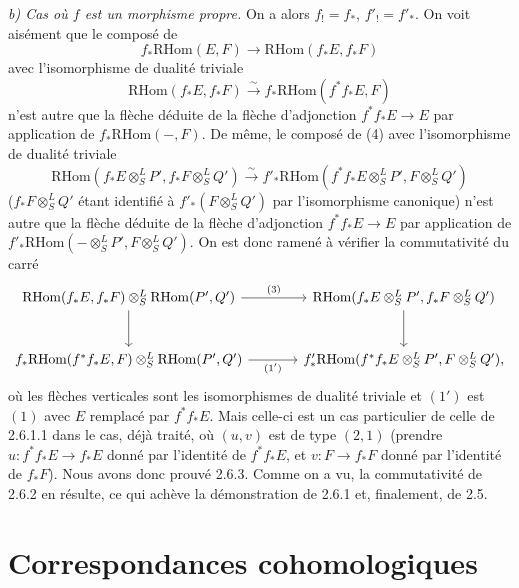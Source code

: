 \documentclass[11pt]{article}
\providecommand{\RHom}{\mathrm{RHom}}
\providecommand{\RHom}{\mathrm{RHom}}
\providecommand{\RHom}{\mathrm R\mathcal{H}om}
\begin{document}
\emph{b) Cas où $f$ est un morphisme propre.} On a alors $f_!=f_*$, $f'_!=f'_*$. On voit aisément que le composé de
\[
f_*\RHom(E,F)\longrightarrow\RHom(f_*E,f_*F)
\]
avec l'isomorphisme de dualité triviale
\[
\RHom(f_*E,f_*F)\xrightarrow{\sim}f_*\RHom(f^{*}f_*E,F)
\]
n'est autre que la flèche déduite de la flèche d'adjonction $f^{*}f_*E\to E$ par application de $f_*\RHom(-,F)$. De même, le composé de (4) avec l'isomorphisme de dualité triviale
\[
\RHom(f_*E\otimes^L_SP',f_*F\otimes^L_SQ')\xrightarrow{\sim}f'_*\RHom(f^{*}f_*E\otimes^L_SP',F\otimes^L_SQ')
\]
($f_*F\otimes^L_SQ'$ étant identifié à $f'_*(F\otimes^L_SQ')$ par l'isomorphisme canonique) n'est autre que la flèche déduite de la flèche d'adjonction $f^{*}f_*E\to E$ par application de $f'_*\RHom(-\otimes^L_SP',F\otimes^L_SQ')$. On est donc ramené à vérifier la commutativité du carré
\[
\begin{tikzcd}[column sep=large,row sep=large]
\RHom(f_*E,f_*F)\otimes^L_S\RHom(P',Q') \arrow[r,"(3)"] \arrow[d] & \RHom(f_*E\otimes^L_SP',f_*F\otimes^L_SQ') \arrow[d]\\
f_*\RHom(f^{*}f_*E,F)\otimes^L_S\RHom(P',Q') \arrow[r,"(1')"'] & f'_*\RHom(f^{*}f_*E\otimes^L_SP',F\otimes^L_SQ'),
\end{tikzcd}
\]
où les flèches verticales sont les isomorphismes de dualité triviale et $(1')$ est $(1)$ avec $E$ remplacé par $f^{*}f_*E$. Mais celle-ci est un cas particulier de celle de 2.6.1.1 dans le cas, déjà traité, où $(u,v)$ est de type $(2,1)$ (prendre $u:f^{*}f_*E\to f_*E$ donné par l'identité de $f^{*}f_*E$, et $v:F\to f_*F$ donné par l'identité de $f_*F$). Nous avons donc prouvé 2.6.3. Comme on a vu, la commutativité de 2.6.2 en résulte, ce qui achève la démonstration de 2.6.1 et, finalement, de 2.5.

\clearpage
\section{Correspondances cohomologiques}
\end{document}
